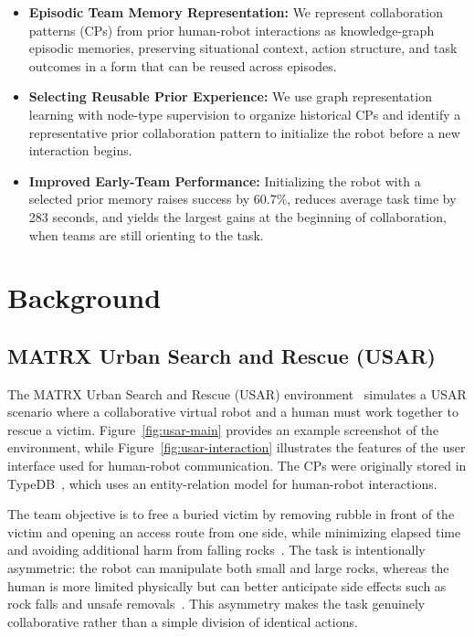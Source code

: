 \documentclass[letterpaper, 10 pt, conference]{ieeeconf}  %
\begin{document}
\begin{itemize}
    \item \textbf{Episodic Team Memory Representation:} We represent collaboration
    patterns (CPs) from prior human-robot interactions as knowledge-graph episodic
    memories, preserving situational context, action structure, and task outcomes in a
    form that can be reused across episodes.
    
    \item \textbf{Selecting Reusable Prior Experience:} We use graph representation
    learning with node-type supervision to organize historical CPs and identify a
    representative prior collaboration pattern to initialize the robot before a new
    interaction begins.


    \item \textbf{Improved Early-Team Performance:} Initializing the robot with a
    selected prior memory raises success by 60.7\%, reduces average task time by 283 seconds,
    and yields the largest gains at the beginning of collaboration, when teams are still
    orienting to the task.
        
\end{itemize}

\section{Background}
\label{sec:background}

\subsection{MATRX Urban Search and Rescue (USAR)}
\label{sec:usar}

The MATRX Urban Search and Rescue (USAR) environment~\cite{matrx_2023,vanZoelen2021}
simulates a USAR scenario where a collaborative virtual robot and a human must work
together to rescue a victim. Figure~\ref{fig:usar-main} provides an example screenshot
of the environment, while Figure~\ref{fig:usar-interaction} illustrates the features of
the user interface used for human-robot communication. The CPs were originally stored in
TypeDB~\cite{typeql2024}, which uses an entity-relation model for human-robot
interactions. 

The team objective is to free a buried victim by removing rubble in front of the victim
and opening an access route from one side, while minimizing elapsed time and avoiding
additional harm from falling rocks~\cite{vanZoelen2021}. The task is intentionally
asymmetric: the robot can manipulate both small and large rocks, whereas the human is
more limited physically but can better anticipate side effects such as rock falls and
unsafe removals~\cite{vanZoelen2021,vanZoelen2025thesis}. This asymmetry makes the task
genuinely collaborative rather than a simple division of identical actions.
\end{document}
